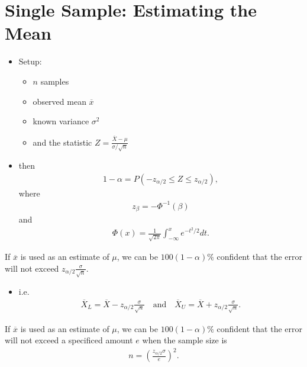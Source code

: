 \documentclass[10pt]{article}
\begin{document}
\section{Single Sample: Estimating the Mean}
\begin{itemize}
    \item Setup:
        \begin{itemize}
            \item $n$ samples
            \item observed mean $\overline{x}$ 
            \item known variance $\sigma^2$ 
            \item and the statistic $Z = \frac{\overline{X}-\mu}{\sigma / \sqrt{n} }$
        \end{itemize}
    \item then 
        \begin{gather*}
            1 - \alpha = P(-z_{\alpha / 2} \le Z \le z_{\alpha / 2}),
        \end{gather*}
        where
        \begin{gather*}
            z_{\beta} = - \Phi^{-1}(\beta)
        \end{gather*}
        and
        \begin{gather*}
            \Phi(x) = \frac{1}{\sqrt{2\pi} } \int_{-\infty}^{x} e^{-t^2 / 2} dt
        .\end{gather*}
\end{itemize}
\begin{theorem}
    If $\overline{x}$ is used as an estimate of $\mu$, we can be $100(1-\alpha)\%$ confident that the error will not exceed $z_{\alpha / 2}\frac{\sigma}{\sqrt{n} }$.
    \begin{itemize}
        \item i.e.
            \begin{gather*}
                \overline{X}_L = \overline{X} - z_{\alpha / 2} \frac{\sigma}{\sqrt{n} } \quad \text{and} \quad \overline{X}_U = \overline{X} + z_{\alpha / 2} \frac{\sigma}{\sqrt{n} }
            .\end{gather*}
    \end{itemize}
\end{theorem}
\begin{theorem}
    If $\overline{x}$ is used as an estimate of $\mu$, we can be $100(1-\alpha)\%$ confident that the error will not exceed a specificed amount $e$ when the sample size is 
    \begin{gather*}
        n = \left( \frac{z_{\alpha / 2}\sigma}{e} \right) ^2
    .\end{gather*}
\end{theorem}
\end{document}
